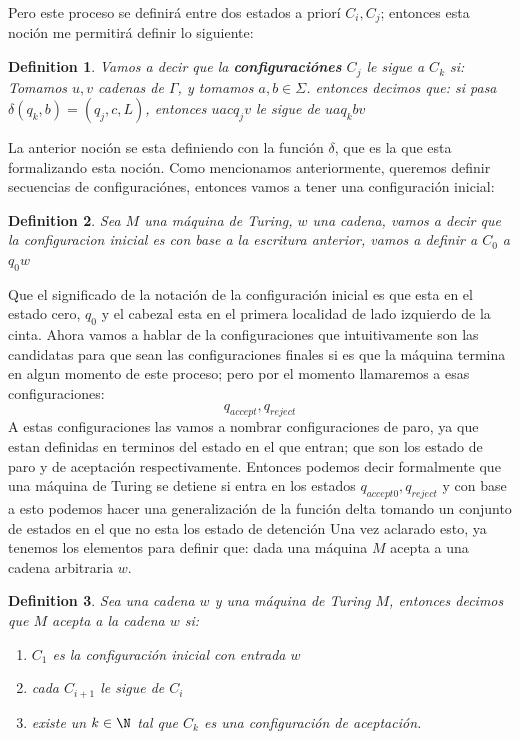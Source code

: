 \documentclass[10pt]{report}
\newtheorem{definition}{Definition}
\begin{document}
    Pero este proceso se definirá entre dos estados a priorí $C_{i},C_{j}$;
    entonces esta noción me permitirá definir lo siguiente:
    \begin{definition}
        Vamos a decir que la \textbf{configuraciónes} $C_{j}$ le sigue a $C_{k}$ si:
        Tomamos $u,v$ cadenas de $\Gamma$, y tomamos $a,b\in \Sigma$.
        entonces decimos que: si pasa $\delta(q_{k},b) = (q_{j},c,L)$,
        entonces $uacq_{j}v$ le sigue de $uaq_{k}bv$

    \end{definition}
    La anterior noción se esta definiendo con la función $\delta$, que es la que esta formalizando esta noción.
    Como mencionamos anteriormente, queremos definir secuencias de configuraciónes, entonces
    vamos a tener una configuración inicial:
    \begin{definition}
        Sea $M$ una máquina de Turing, $w$ una cadena,
        vamos a decir que la configuracion inicial es con base a la escritura
        anterior, vamos a definir a $C_{0}$ a $q_{0}w$
    \end{definition}
    Que el significado de la notación de la configuración inicial es que esta en
    el estado cero, $q_{0}$ y el cabezal esta en el primera localidad de lado izquierdo de la cinta.
    Ahora vamos a hablar de la configuraciones que intuitivamente son las candidatas para
    que sean las configuraciones finales si es que la máquina termina en algun momento de este
    proceso; pero por el momento llamaremos a esas configuraciones:\newline
    \begin{equation}
        q_{accept}, q_{reject}\label{eq:equation8}
    \end{equation}
    A estas configuraciones las vamos a nombrar configuraciones de paro, ya que estan definidas
    en terminos del estado en el que entran; que son los estado de paro y de aceptación respectivamente.
    Entonces podemos decir formalmente que una máquina de Turing se detiene si entra en los estados
    $q_{accept0},q_{reject}$ y con base a esto podemos hacer una generalización de la función delta tomando
    un conjunto de estados en el que no esta los estado de detención
    \newline
    Una vez aclarado esto, ya tenemos los elementos para definir que: dada una máquina $M$ acepta a una
    cadena arbitraria $w$.
    \begin{definition}
        Sea una cadena $w$ y una máquina de Turing $M$,\newline
        entonces decimos que $M$ acepta a la cadena $w$ si:
        \begin{enumerate}
            \item $C_{1}$ es la configuración inicial con entrada $w$
            \item cada $C_{i+1}$ le sigue de $C_{i}$
            \item existe un $k \in \N$ tal que $C_{k}$ es una configuración de aceptación.
        \end{enumerate}
    \end{definition}
\end{document}
